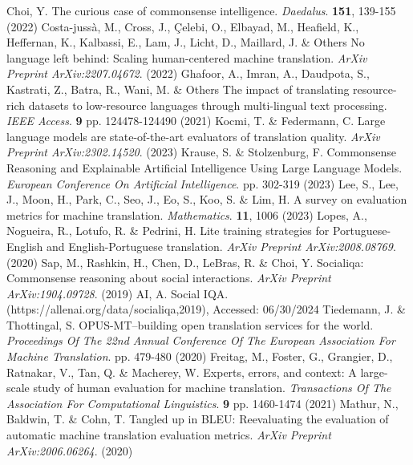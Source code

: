 \documentclass[runningheads]{llncs}
\begin{document}
\begin{thebibliography}{8}
Choi, Y. The curious case of commonsense intelligence. {\em Daedalus}. \textbf{151}, 139-155 (2022)
Costa-jussà, M., Cross, J., Çelebi, O., Elbayad, M., Heafield, K., Heffernan, K., Kalbassi, E., Lam, J., Licht, D., Maillard, J. \& Others No language left behind: Scaling human-centered machine translation. {\em ArXiv Preprint ArXiv:2207.04672}. (2022)
Ghafoor, A., Imran, A., Daudpota, S., Kastrati, Z., Batra, R., Wani, M. \& Others The impact of translating resource-rich datasets to low-resource languages through multi-lingual text processing. {\em IEEE Access}. \textbf{9} pp. 124478-124490 (2021)
Kocmi, T. \& Federmann, C. Large language models are state-of-the-art evaluators of translation quality. {\em ArXiv Preprint ArXiv:2302.14520}. (2023)
Krause, S. \& Stolzenburg, F. Commonsense Reasoning and Explainable Artificial Intelligence Using Large Language Models. {\em European Conference On Artificial Intelligence}. pp. 302-319 (2023)
Lee, S., Lee, J., Moon, H., Park, C., Seo, J., Eo, S., Koo, S. \& Lim, H. A survey on evaluation metrics for machine translation. {\em Mathematics}. \textbf{11}, 1006 (2023)
Lopes, A., Nogueira, R., Lotufo, R. \& Pedrini, H. Lite training strategies for Portuguese-English and English-Portuguese translation. {\em ArXiv Preprint ArXiv:2008.08769}. (2020)
Sap, M., Rashkin, H., Chen, D., LeBras, R. \& Choi, Y. Socialiqa: Commonsense reasoning about social interactions. {\em ArXiv Preprint ArXiv:1904.09728}. (2019)
AI, A. Social IQA. (https://allenai.org/data/socialiqa,2019), Accessed: 06/30/2024
Tiedemann, J. \& Thottingal, S. OPUS-MT–building open translation services for the world. {\em Proceedings Of The 22nd Annual Conference Of The European Association For Machine Translation}. pp. 479-480 (2020)
Freitag, M., Foster, G., Grangier, D., Ratnakar, V., Tan, Q. \& Macherey, W. Experts, errors, and context: A large-scale study of human evaluation for machine translation. {\em Transactions Of The Association For Computational Linguistics}. \textbf{9} pp. 1460-1474 (2021)
Mathur, N., Baldwin, T. \& Cohn, T. Tangled up in BLEU: Reevaluating the evaluation of automatic machine translation evaluation metrics. {\em ArXiv Preprint ArXiv:2006.06264}. (2020)

\end{thebibliography}
\end{document}
